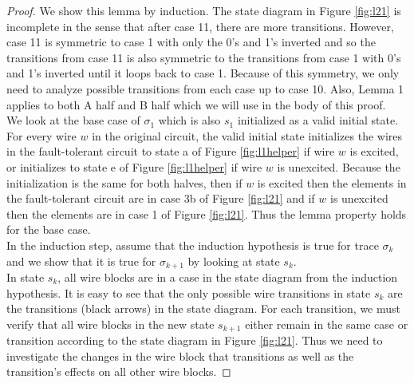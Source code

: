 \documentclass[12pt]{report}
\begin{document}
\begin{proof}
We show this lemma by induction.  The state diagram in Figure \ref{fig:l21} is incomplete in the sense that after case 11, there are more transitions.  However, case 11 is symmetric to case 1 with only the 0's and 1's inverted and so the transitions from case 11 is also symmetric to the transitions from case 1 with 0's and 1's inverted until it loops back to case 1.  Because of this symmetry, we only need to analyze possible transitions from each case up to case 10.  Also, Lemma 1 applies to both A half and B half which we will use in the body of this proof.\\

We look at the base case of $\sigma_1$ which is also $s_1$ initialized as a valid initial state.  For every wire $w$ in the original circuit, the valid initial state initializes the wires in the fault-tolerant circuit to state a of Figure \ref{fig:l1helper} if wire $w$ is excited, or initializes to state e of Figure \ref{fig:l1helper} if wire $w$ is unexcited.  Because the initialization is the same for both halves, then if $w$ is excited then the elements in the fault-tolerant circuit are in case 3b of Figure \ref{fig:l21} and if $w$ is unexcited then the elements are in case 1 of Figure \ref{fig:l21}.  Thus the lemma property holds for the base case. \\

In the induction step, assume that the induction hypothesis is true for trace $\sigma_k$ and we show that it is true for $\sigma_{k+1}$ by looking at state $s_k$.  \\

In state $s_k$, all wire blocks are in a case in the state diagram from the induction hypothesis.  It is easy to see that the only possible wire transitions in state $s_k$ are the transitions (black arrows) in the state diagram.  
For each transition, we must verify that all wire blocks in the new state $s_{k+1}$ either remain in the same case or transition according to the state diagram in Figure \ref{fig:l21}.  Thus we need to investigate the changes in the wire block that transitions as well as the transition's effects on all other wire blocks. 


\end{proof}
\end{document}
